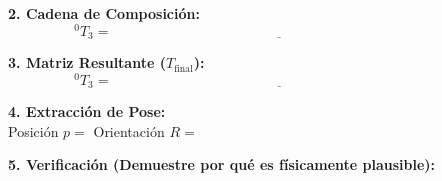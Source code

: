 \documentclass[11pt, a4paper]{article}
\begin{document}
\noindent \textbf{2. Cadena de Composición:}
\begin{equation*}
    {}^0T_3 = \underline{\hspace{10cm}}
\end{equation*}

\vspace{0.4cm}
\noindent \textbf{3. Matriz Resultante ($T_{\text{final}}$):}
\begin{equation*}
    {}^0T_3 = \underline{\hspace{10cm}}
\end{equation*}

\vspace{1.5cm}
\noindent \textbf{4. Extracción de Pose:} \\
Posición $p = $ \underline{\hspace{5cm}} \quad Orientación $R = $ \underline{\hspace{5cm}}

\vspace{1.5cm}
\noindent \textbf{5. Verificación (Demuestre por qué es físicamente plausible):} \\
\underline{\hspace{15cm}} \\
\underline{\hspace{15cm}}
\end{document}
